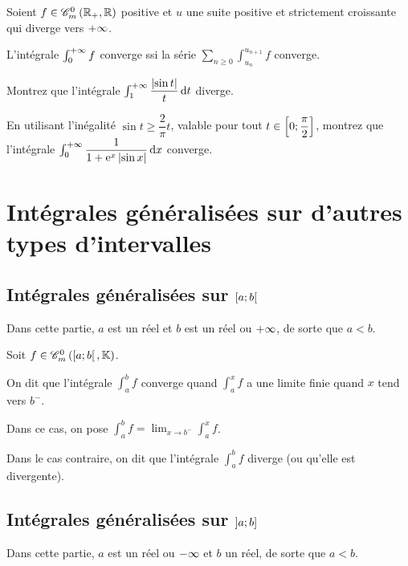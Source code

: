 \begin{prop}
Soient \(f\in\contm[\Rp][\R]\) positive et \(u\) une suite positive et strictement croissante qui diverge vers \(+\infty\).

L'intégrale \(\int_0^{+\infty}f\) converge ssi la série \(\sum_{n\geq0}\int_{u_n}^{u_{n+1}}f\) converge.
\end{prop}

\begin{exo}
Montrez que l'intégrale \(\int_1^{\pinf}\dfrac{\abs{\sin t}}{t}\odif{t}\) diverge.
\end{exo}

\begin{exo}
En utilisant l'inégalité \(\sin t\geq\dfrac{2}{\pi}t\), valable pour tout \(t\in\left[0;\dfrac{\pi}{2}\right]\), montrez que l'intégrale \(\int_0^{\pinf}\dfrac{1}{1+\e{x}\abs{\sin x}}\odif{x}\) converge.
\end{exo}

\section{Intégrales généralisées sur d'autres types d'intervalles}

\subsection{Intégrales généralisées sur \(\left[a;b\right[\)}

Dans cette partie, \(a\) est un réel et \(b\) est un réel ou \(+\infty\), de sorte que \(a<b\).

\begin{defi}
Soit \(f\in\contm[\intervie{a}{b}]\).

On dit que l'intégrale \(\int_a^bf\) converge quand \(\int_a^xf\) a une limite finie quand \(x\) tend vers \(b^-\).

Dans ce cas, on pose \(\int_a^bf=\lim_{x\to b^-}\int_a^xf\).

Dans le cas contraire, on dit que l'intégrale \(\int_a^bf\) diverge (ou qu'elle est divergente).
\end{defi}

\subsection{Intégrales généralisées sur \(\left]a;b\right]\)}

Dans cette partie, \(a\) est un réel ou \(-\infty\) et \(b\) un réel, de sorte que \(a<b\).

